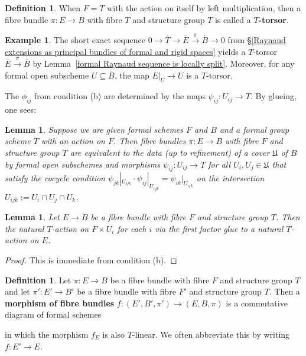 \documentclass[10pt,oneside]{amsart}
\newtheorem{lemma}[theorem]{Lemma}
\theoremstyle{definition}
\newtheorem{definition}[theorem]{Definition}
\newtheorem{example}[theorem]{Example}
\begin{document}
	\begin{definition}
		When $F=T$ with the action on itself by left multiplication, then a fibre bundle $\pi\colon E\rightarrow B$ with fibre $T$ and structure group $T$ is called a \textbf{$T$-torsor}.
	\end{definition}
	
	\begin{example}
		The short exact sequence $0\rightarrow \overline{T}\rightarrow \overline{E}\xrightarrow{\pi} \overline{B}\rightarrow 0$ from \S\ref{Raynaud extensions as principal bundles of formal and rigid spaces} yields a $T$-torsor $\overline{E}\xrightarrow{\pi} \overline{B}$ by Lemma~\ref{formal Raynaud sequence is locally split}. Moreover, for any formal open subscheme $U\subseteq \overline{B}$, the map $E|_U\rightarrow U$ is a $T$-torsor.
	\end{example}
	
	The $\phi_{ij}$ from condition (b) are determined by the maps $\psi_{ij}\colon U_{ij}\rightarrow T$. By glueing, one sees:
	\begin{lemma}\label{equivalent characterisation of principal $T$-bundle}
		Suppose we are given formal schemes $F$ and $B$ and a formal group scheme $T$ with an action on $F$. Then fibre bundles $\pi\colon E\rightarrow B$ with fibre $F$ and structure group $T$ are equivalent to the data (up to refinement) of a cover $\mathfrak U$ of $B$ by formal open subschemes and morphisms $\psi_{ij}\colon U_{ij}\rightarrow T$ for all $U_i,U_j\in \mathfrak U$ that satisfy the cocycle condition $\psi_{jk}|_{U_{ijk}}\cdot \psi_{ij}|_{U_{ijk}}=\psi_{ik}|_{U_{ijk}}$ on the intersection $U_{ijk}:=U_i\cap U_j\cap U_k$.
	\end{lemma}
	\begin{lemma}
		Let $E\rightarrow B$ be a fibre bundle with fibre $F$ and structure group $T$. Then the natural $T$-action on $F\times U_{i}$ for each $i$ via the first factor glue to a natural $T$-action on $E$.
	\end{lemma}
	\begin{proof}
		This is immediate from condition (b).
	\end{proof}
	\begin{definition}
		Let $\pi\colon E\rightarrow B$ be a fibre bundle with fibre $F$ and structure group $T$ and let $\pi'\colon E'\rightarrow B'$ be a fibre bundle with fibre $F'$ and structure group $T$. Then a \textbf{morphism of fibre bundles} $f\colon (E',B',\pi')\rightarrow (E,B,\pi)$ is a commutative diagram of formal schemes
		\begin{center}
		\end{center}
		in which the morphism $f_E$ is also $T$-linear. We often abbreviate this by writing $f\colon E'\rightarrow E$.
	\end{definition}
\end{document}
